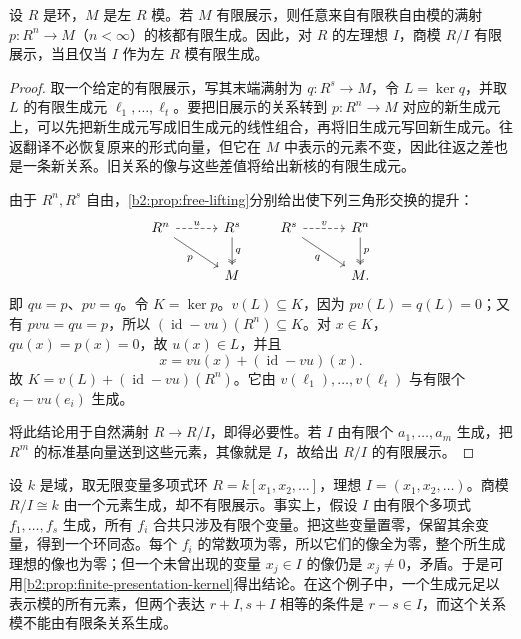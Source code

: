 \begin{proposition}\label{b2:prop:finite-presentation-kernel}
	设 \(R\) 是环，\(M\) 是左 \(R\) 模。若 \(M\) 有限展示，则任意来自有限秩自由模的满射 \(p:R^n\to M\)（\(n<\infty\)）的核都有限生成。因此，对 \(R\) 的左理想 \(I\)，商模 \(R/I\) 有限展示，当且仅当 \(I\) 作为左 \(R\) 模有限生成。
\end{proposition}
\begin{proof}
	取一个给定的有限展示，写其末端满射为 \(q:R^s\to M\)，令 \(L=\ker q\)，并取 \(L\) 的有限生成元 \(\ell_1,\ldots,\ell_t\)。要把旧展示的关系转到 \(p:R^n\to M\) 对应的新生成元上，可以先把新生成元写成旧生成元的线性组合，再将旧生成元写回新生成元。往返翻译不必恢复原来的形式向量，但它在 \(M\) 中表示的元素不变，因此往返之差也是一条新关系。旧关系的像与这些差值将给出新核的有限生成元。

	由于 \(R^n,R^s\) 自由，\cref{b2:prop:free-lifting}分别给出使下列三角形交换的提升：
	\[
		\begin{tikzcd}[column sep=3em,row sep=2em]
			R^n \arrow[r,dashed,"u"] \arrow[dr,"p"'] & R^s \arrow[d,"q",two heads] \\
			& M
		\end{tikzcd}
		\qquad
		\begin{tikzcd}[column sep=3em,row sep=2em]
			R^s \arrow[r,dashed,"v"] \arrow[dr,"q"'] & R^n \arrow[d,"p",two heads] \\
			& M.
		\end{tikzcd}
	\]
	即 \(qu=p\)、\(pv=q\)。令 \(K=\ker p\)。\(v(L)\subseteq K\)，因为 \(pv(L)=q(L)=0\)；又有 \(pvu=qu=p\)，所以 \((\operatorname{id}-vu)(R^n)\subseteq K\)。对 \(x\in K\)，\(qu(x)=p(x)=0\)，故 \(u(x)\in L\)，并且
	\[
		x=vu(x)+(\operatorname{id}-vu)(x).
	\]
	故 \(K=v(L)+(\operatorname{id}-vu)(R^n)\)。它由 \(v(\ell_1),\ldots,v(\ell_t)\) 与有限个 \(e_i-vu(e_i)\) 生成。

	将此结论用于自然满射 \(R\to R/I\)，即得必要性。若 \(I\) 由有限个 \(a_1,\ldots,a_m\) 生成，把 \(R^m\) 的标准基向量送到这些元素，其像就是 \(I\)，故给出 \(R/I\) 的有限展示。
\end{proof}

设 \(k\) 是域，取无限变量多项式环 \(R=k[x_1,x_2,\ldots]\)，理想 \(I=(x_1,x_2,\ldots)\)。商模 \(R/I\cong k\) 由一个元素生成，却不有限展示。事实上，假设 \(I\) 由有限个多项式 \(f_1,\ldots,f_s\) 生成，所有 \(f_i\) 合共只涉及有限个变量。把这些变量置零，保留其余变量，得到一个环同态。每个 \(f_i\) 的常数项为零，所以它们的像全为零，整个所生成理想的像也为零；但一个未曾出现的变量 \(x_j\in I\) 的像仍是 \(x_j\ne0\)，矛盾。于是可用\cref{b2:prop:finite-presentation-kernel}得出结论。在这个例子中，一个生成元足以表示模的所有元素，但两个表达 \(r+I,s+I\) 相等的条件是 \(r-s\in I\)，而这个关系模不能由有限条关系生成。

